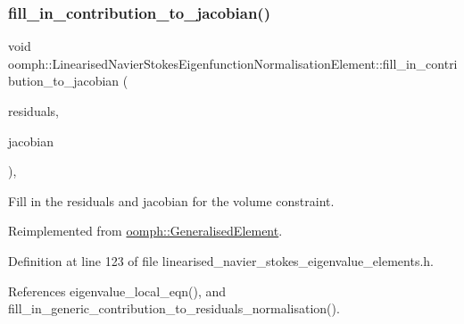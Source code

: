 \subsubsection{\texorpdfstring{fill\+\_\+in\+\_\+contribution\+\_\+to\+\_\+jacobian()}{fill\_in\_contribution\_to\_jacobian()}}
{\footnotesize\ttfamily void oomph\+::\+Linearised\+Navier\+Stokes\+Eigenfunction\+Normalisation\+Element\+::fill\+\_\+in\+\_\+contribution\+\_\+to\+\_\+jacobian (\begin{DoxyParamCaption}\item[{\hyperlink{classoomph_1_1Vector}{Vector}$<$ double $>$ \&}]{residuals,  }\item[{\hyperlink{classoomph_1_1DenseMatrix}{Dense\+Matrix}$<$ double $>$ \&}]{jacobian }\end{DoxyParamCaption})\hspace{0.3cm}{\ttfamily [inline]}, {\ttfamily [virtual]}}



Fill in the residuals and jacobian for the volume constraint. 



Reimplemented from \hyperlink{classoomph_1_1GeneralisedElement_a6ae09fc0d68e4309ac1b03583d252845}{oomph\+::\+Generalised\+Element}.



Definition at line 123 of file linearised\+\_\+navier\+\_\+stokes\+\_\+eigenvalue\+\_\+elements.\+h.



References eigenvalue\+\_\+local\+\_\+eqn(), and fill\+\_\+in\+\_\+generic\+\_\+contribution\+\_\+to\+\_\+residuals\+\_\+normalisation().

\mbox{\label{classoomph_1_1LinearisedNavierStokesEigenfunctionNormalisationElement_a2ccaac6c10a84733c6efab8890d3f048}} 
